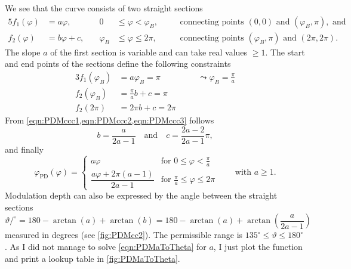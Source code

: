 \documentclass[a4paper]{article}
\begin{document}
We see that the curve consists of two straight sections
\begin{alignat}{5}
  f_1(\varphi) &= a\varphi, 
  & \quad 0&\leq\varphi <\varphi_B, 
  && \quad\text{connecting points } (0,0) \text{ and } (\varphi_B,\pi),\text{ and}
\\
  f_2(\varphi) &= b\varphi+c, 
  & \quad \varphi_B&\leq\varphi \leq 2\pi, 
  && \quad\text{connecting points } (\varphi_B,\pi) \text{ and } (2\pi,2\pi).
\end{alignat}
The slope $a$ of the first section is variable and can take real values $\geq
1$. The start and end points of the sections define the following constraints
\begin{alignat}{3}
  \label{eqn:PDMccc1}
  f_1(\varphi_B) &= a\varphi_B = \pi
  && \quad\leadsto \varphi_B = \frac{\pi}{a}
\\
  \label{eqn:PDMccc2}
  f_2(\varphi_B) &= \frac{\pi}{a}b + c = \pi
\\
  \label{eqn:PDMccc3}
  f_2(2\pi) &= 2\pi b + c = 2\pi
\end{alignat}
From \cref{eqn:PDMccc1,eqn:PDMccc2,eqn:PDMccc3} follows
\begin{equation}
  b = \frac{a}{2a-1}
  \quad\text{and}\quad
  c = \frac{2a-2}{2a-1}\pi,
\end{equation}
and finally
\begin{equation}
  \varphi_{\text{PD}}(\varphi)
  = \begin{cases}
      a\varphi
      & \text{for }0\leq\varphi < \frac{\pi}{a}
    \\[6pt]
      \dfrac{a\varphi+2\pi(a-1)}{2a-1}
      & \text{for }\frac{\pi}{a}\leq\varphi \leq 2\pi 
    \end{cases}
  \qquad\text{with }a\geq 1.
\end{equation}
Modulation depth can also be expressed by the angle between the straight
sections
\begin{equation}
  \label{eqn:PDMaToTheta}
  \vartheta/^{\circ} 
  = 180-\arctan(a)+\arctan(b)
  = 180-\arctan(a)+\arctan\!\left(\frac{a}{2a-1}\right)
\end{equation}
measured in degrees (see \cref{fig:PDMcc2}). The permissible range is
$135^\circ\leq\vartheta\leq 180^\circ$ \cite{Ger09}. As I did not manage to
solve \cref{eqn:PDMaToTheta} for $a$, I just plot the function and print a
lookup table in \cref{fig:PDMaToTheta}.
%
\end{document}
